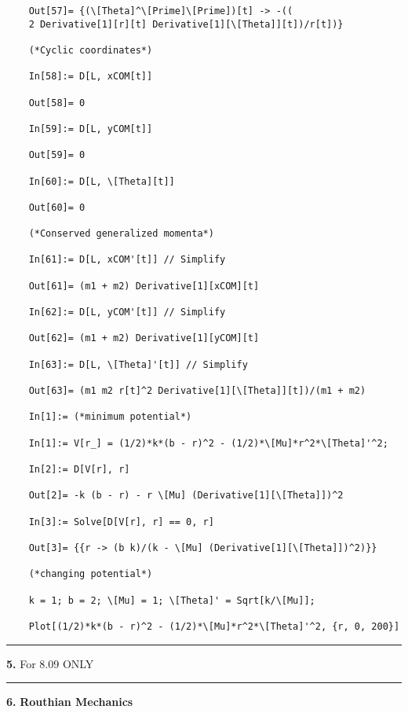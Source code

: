 \documentclass{article}
\theoremstyle{definition}
\begin{document}
\begin{enumerate}[label = (\alph*)]
\begin{lstlisting}
	Out[57]= {(\[Theta]^\[Prime]\[Prime])[t] -> -((
	2 Derivative[1][r][t] Derivative[1][\[Theta]][t])/r[t])}
	
	(*Cyclic coordinates*)
	
	In[58]:= D[L, xCOM[t]]
	
	Out[58]= 0
	
	In[59]:= D[L, yCOM[t]]
	
	Out[59]= 0
	
	In[60]:= D[L, \[Theta][t]]
	
	Out[60]= 0
	
	(*Conserved generalized momenta*)
	
	In[61]:= D[L, xCOM'[t]] // Simplify
	
	Out[61]= (m1 + m2) Derivative[1][xCOM][t]
	
	In[62]:= D[L, yCOM'[t]] // Simplify
	
	Out[62]= (m1 + m2) Derivative[1][yCOM][t]
	
	In[63]:= D[L, \[Theta]'[t]] // Simplify
	
	Out[63]= (m1 m2 r[t]^2 Derivative[1][\[Theta]][t])/(m1 + m2)
	
	In[1]:= (*minimum potential*)
	
	In[1]:= V[r_] = (1/2)*k*(b - r)^2 - (1/2)*\[Mu]*r^2*\[Theta]'^2;
	
	In[2]:= D[V[r], r]
	
	Out[2]= -k (b - r) - r \[Mu] (Derivative[1][\[Theta]])^2
	
	In[3]:= Solve[D[V[r], r] == 0, r]
	
	Out[3]= {{r -> (b k)/(k - \[Mu] (Derivative[1][\[Theta]])^2)}}
	
	(*changing potential*)
	
	k = 1; b = 2; \[Mu] = 1; \[Theta]' = Sqrt[k/\[Mu]];
	
	Plot[(1/2)*k*(b - r)^2 - (1/2)*\[Mu]*r^2*\[Theta]'^2, {r, 0, 200}]
	\end{lstlisting}
\end{enumerate}




\hrule

$\,$\\


\noindent \textbf{5.} For 8.09 ONLY\\


\hrule

$\,$\\


\noindent \textbf{6.} \textbf{Routhian Mechanics}\\
\end{document}
